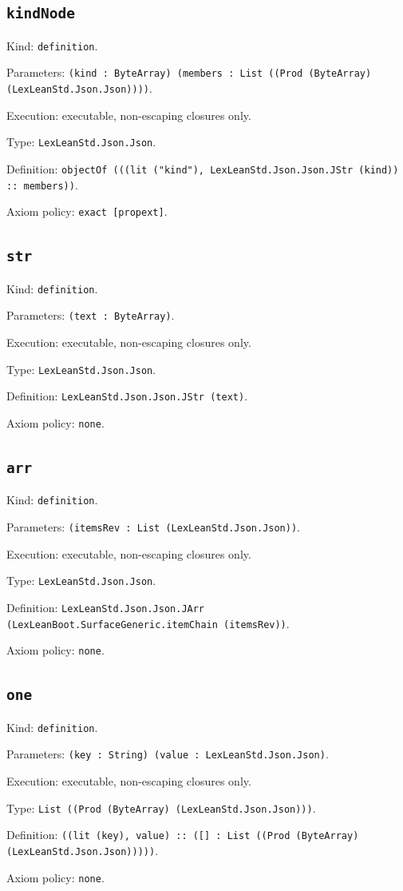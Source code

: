 \documentclass[11pt]{article}
\begin{document}
\subsection*{\texttt{kindNode}}
\noindent Kind: \texttt{definition}.\par
\noindent Parameters: \texttt{(kind : ByteArray) (members : List ((Prod (ByteArray) (LexLeanStd.Json.Json))))}.\par
\noindent Execution: executable, non-escaping closures only.\par
\noindent Type: \texttt{LexLeanStd.Json.Json}.\par
\noindent Definition: \texttt{objectOf (((lit ("kind"), LexLeanStd.Json.Json.JStr (kind)) :: members))}.\par
\noindent Axiom policy: \texttt{exact [propext]}.\par
\subsection*{\texttt{str}}
\noindent Kind: \texttt{definition}.\par
\noindent Parameters: \texttt{(text : ByteArray)}.\par
\noindent Execution: executable, non-escaping closures only.\par
\noindent Type: \texttt{LexLeanStd.Json.Json}.\par
\noindent Definition: \texttt{LexLeanStd.Json.Json.JStr (text)}.\par
\noindent Axiom policy: \texttt{none}.\par
\subsection*{\texttt{arr}}
\noindent Kind: \texttt{definition}.\par
\noindent Parameters: \texttt{(itemsRev : List (LexLeanStd.Json.Json))}.\par
\noindent Execution: executable, non-escaping closures only.\par
\noindent Type: \texttt{LexLeanStd.Json.Json}.\par
\noindent Definition: \texttt{LexLeanStd.Json.Json.JArr (LexLeanBoot.SurfaceGeneric.itemChain (itemsRev))}.\par
\noindent Axiom policy: \texttt{none}.\par
\subsection*{\texttt{one}}
\noindent Kind: \texttt{definition}.\par
\noindent Parameters: \texttt{(key : String) (value : LexLeanStd.Json.Json)}.\par
\noindent Execution: executable, non-escaping closures only.\par
\noindent Type: \texttt{List ((Prod (ByteArray) (LexLeanStd.Json.Json)))}.\par
\noindent Definition: \texttt{((lit (key), value) :: ([] : List ((Prod (ByteArray) (LexLeanStd.Json.Json)))))}.\par
\noindent Axiom policy: \texttt{none}.\par
\end{document}
